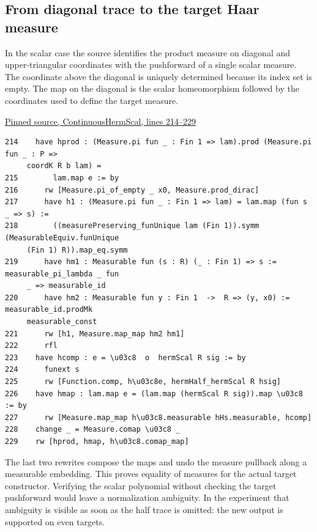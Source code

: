 \documentclass[12pt,letterpaper]{article}
\begin{document}
\clearpage\subsection*{From diagonal trace to the target Haar measure}

In the scalar case the source identifies the product measure on diagonal and upper-triangular coordinates with the pushforward of a single scalar measure. The coordinate above the diagonal is uniquely determined because its index set is empty. The map on the diagonal is the scalar homeomorphism followed by the coordinates used to define the target measure.

\par\smallskip\href{https://github.com/nousentllc/riemann-hypothesis/blob/40e56bab026552e089d7afcfeff08d2defb9c005/src/CompanionTheory/SpectralGeometry/LocalGlobalProofs/AdelicAnalysis/ContinuousHermScal.lean#L214-L229}{\sffamily\small Pinned source, ContinuousHermScal, lines 214--229}\par

{\footnotesize\begin{verbatim}
214    have hprod : (Measure.pi fun _ : Fin 1 => lam).prod (Measure.pi fun _ : P =>
     coordK R b lam) =
215        lam.map e := by
216      rw [Measure.pi_of_empty _ x0, Measure.prod_dirac]
217      have h1 : (Measure.pi fun _ : Fin 1 => lam) = lam.map (fun s _ => s) :=
218        ((measurePreserving_funUnique lam (Fin 1)).symm (MeasurableEquiv.funUnique
     (Fin 1) R)).map_eq.symm
219      have hm1 : Measurable fun (s : R) (_ : Fin 1) => s := measurable_pi_lambda _ fun
     _ => measurable_id
220      have hm2 : Measurable fun y : Fin 1  ->  R => (y, x0) := measurable_id.prodMk
     measurable_const
221      rw [h1, Measure.map_map hm2 hm1]
222      rfl
223    have hcomp : e = \u03c8  o  hermScal R sig := by
224      funext s
225      rw [Function.comp, h\u03c8e, hermHalf_hermScal R hsig]
226    have hmap : lam.map e = (lam.map (hermScal R sig)).map \u03c8 := by
227      rw [Measure.map_map h\u03c8.measurable hHs.measurable, hcomp]
228    change _ = Measure.comap \u03c8 _
229    rw [hprod, hmap, h\u03c8.comap_map]
\end{verbatim}
}

The last two rewrites compose the maps and undo the measure pullback along a measurable embedding. This proves equality of measures for the actual target constructor. Verifying the scalar polynomial without checking the target pushforward would leave a normalization ambiguity. In the experiment that ambiguity is visible as soon as the half trace is omitted: the new output is supported on even targets.
\end{document}
